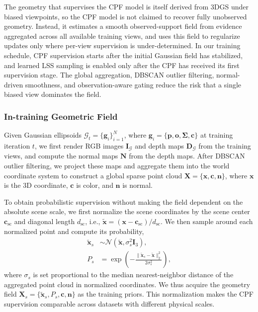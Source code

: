 \documentclass[lettersize,journal]{IEEEtran}
\begin{document}
The geometry that supervises the CPF model is itself derived from 3DGS under biased viewpoints, so the CPF model is not claimed to recover fully unobserved geometry. Instead, it estimates a smooth observed-support field from evidence aggregated across all available training views, and uses this field to regularize updates only where per-view supervision is under-determined. In our training schedule, CPF supervision starts after the initial Gaussian field has stabilized, and learned LSS sampling is enabled only after the CPF has received its first supervision stage. The global aggregation, DBSCAN outlier filtering, normal-driven smoothness, and observation-aware gating reduce the risk that a single biased view dominates the field.


\subsubsection{In-training Geometric Field}

Given Gaussian ellipsoids 
$\mathcal{G}_t = \{\mathbf{g}_i\}_{i=1}^N$, where $\mathbf{g}_i = \{ \mathbf{p}, \mathbf{o}, \mathbf{\Sigma}, \mathbf{c} \}$ 
at training iteration $t$, we first render RGB images $\mathbf{I}_{\mathcal{G}}$ and depth maps $\mathbf{D}_{\mathcal{G}}$ from the training views, and compute the normal maps $\mathbf{N}$ from the depth maps. 
After DBSCAN outlier filtering, 
we project these maps and aggregate them into the world coordinate system to construct a global sparse point cloud $\mathbf{X} = \{ \mathbf{x}, \mathbf{c}, \mathbf{n} \}$, where $\mathbf{x}$ is the 3D coordinate, $\mathbf{c}$ is color, and $\mathbf{n}$ is normal.

To obtain probabilistic supervision without making the field dependent on the absolute scene scale, we first normalize the scene coordinates by the scene center $\mathbf{c}_{\mathrm{sc}}$ and diagonal length $d_{\mathrm{sc}}$, i.e., $\tilde{\mathbf{x}}=(\mathbf{x}-\mathbf{c}_{\mathrm{sc}})/d_{\mathrm{sc}}$. We then sample around each normalized point and compute its probability,
\begin{align}
    \tilde{\mathbf{x}}_{s} &\sim \mathcal{N}(\tilde{\mathbf{x}}, \sigma_s^2\mathbf{I}_3), \label{eq19} \\
    P_{s} &= \exp\left(-\frac{\|\tilde{\mathbf{x}}_{s}-\tilde{\mathbf{x}}\|_2^2}{2\sigma_s^2}\right), \label{eq20}
\end{align}
where $\sigma_s$ is set proportional to the median nearest-neighbor distance of the aggregated point cloud in normalized coordinates. We thus acquire the geometry field $\mathbf{X}_{s} = \{ \tilde{\mathbf{x}}_{s}, P_{s}, \mathbf{c}, \mathbf{n} \}$ as the training priors. This normalization makes the CPF supervision comparable across datasets with different physical scales.
\end{document}
